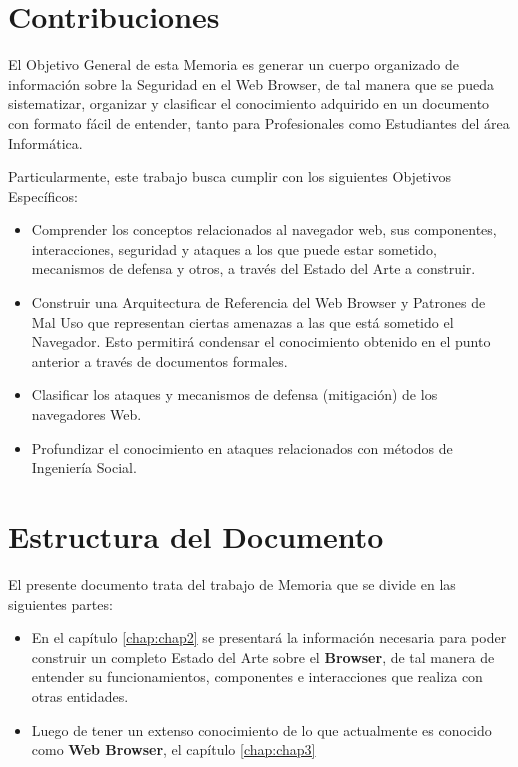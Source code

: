 \section{Contribuciones}
\label{chap:contr}

El Objetivo General de esta Memoria es generar un cuerpo organizado de información sobre la Seguridad en el Web Browser, de tal manera que se pueda sistematizar, organizar y clasificar el conocimiento adquirido en un documento con formato fácil de entender, tanto para Profesionales como Estudiantes del área Informática. 

Particularmente, este trabajo busca cumplir con los siguientes Objetivos Específicos:

\begin{itemize}
	\item Comprender los conceptos relacionados al navegador web, sus componentes, interacciones, seguridad y ataques a los que puede estar sometido, mecanismos de defensa y otros, a través del Estado del Arte a construir.
	\item Construir una Arquitectura de Referencia del Web Browser y Patrones de Mal Uso que representan ciertas amenazas a las que está sometido el Navegador. Esto permitirá condensar el conocimiento obtenido en el punto anterior a través de documentos formales.
	\item Clasificar los ataques y mecanismos de defensa (mitigación) de los navegadores Web.
	\item Profundizar el conocimiento en ataques relacionados con métodos de Ingeniería Social.
	
\end{itemize} 


\section{Estructura del Documento}
\label{chap:estruct}

El presente documento trata del trabajo de Memoria que se divide en las siguientes partes:

\begin{itemize}
	\item En el capítulo \ref{chap:chap2} se presentará la información necesaria para poder construir un completo Estado del Arte sobre el \textbf{Browser}, de tal manera de entender su funcionamientos, componentes e interacciones que realiza con otras entidades. 
	\item Luego de tener un extenso conocimiento de lo que actualmente es conocido como \textbf{Web Browser}, el capítulo \ref{chap:chap3}
\end{itemize}





